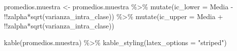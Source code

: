 \documentclass[
]{book}
\newenvironment{Shaded}{\begin{snugshade}}{\end{snugshade}}
\newcommand{\AttributeTok}[1]{\textcolor[rgb]{0.77,0.63,0.00}{#1}}
\newcommand{\FunctionTok}[1]{\textcolor[rgb]{0.00,0.00,0.00}{#1}}
\newcommand{\NormalTok}[1]{#1}
\newcommand{\OtherTok}[1]{\textcolor[rgb]{0.56,0.35,0.01}{#1}}
\newcommand{\SpecialCharTok}[1]{\textcolor[rgb]{0.00,0.00,0.00}{#1}}
\newcommand{\StringTok}[1]{\textcolor[rgb]{0.31,0.60,0.02}{#1}}
\begin{document}
\begin{Shaded}
\begin{Highlighting}[]
\NormalTok{promedios.muestra }\OtherTok{\textless{}{-}}\NormalTok{ promedios.muestra }\SpecialCharTok{\%\textgreater{}\%}
  \FunctionTok{mutate}\NormalTok{(}\AttributeTok{ic\_lower =}\NormalTok{ Media }\SpecialCharTok{{-}} \SpecialCharTok{!!}\NormalTok{zalpha}\SpecialCharTok{*}\FunctionTok{sqrt}\NormalTok{(varianza\_intra\_clase)) }\SpecialCharTok{\%\textgreater{}\%}
  \FunctionTok{mutate}\NormalTok{(}\AttributeTok{ic\_upper =}\NormalTok{ Media }\SpecialCharTok{+} \SpecialCharTok{!!}\NormalTok{zalpha}\SpecialCharTok{*}\FunctionTok{sqrt}\NormalTok{(varianza\_intra\_clase))}

\FunctionTok{kable}\NormalTok{(promedios.muestra) }\SpecialCharTok{\%\textgreater{}\%} \FunctionTok{kable\_styling}\NormalTok{(}\AttributeTok{latex\_options =} \StringTok{"striped"}\NormalTok{)}
\end{Highlighting}
\end{Shaded}
\end{document}
